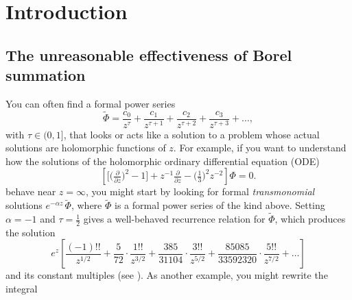 \documentclass{article}
\theoremstyle{definition}
\newcommand{\series}[1]{\tilde{#1}}
\begin{document}
\section{Introduction}
\subsection{The unreasonable effectiveness of Borel summation}\label{intro:summation}
You can often find a formal power series %
\[ \series{\Phi} = \frac{c_0}{z^\tau} + \frac{c_1}{z^{\tau+1}} + \frac{c_2}{z^{\tau+2}} + \frac{c_3}{z^{\tau+3}} + \ldots, \]
with $\tau \in (0, 1]$, that looks or acts like a solution to a problem whose actual solutions are holomorphic functions of $z$. For example, if you want to understand how the solutions of the holomorphic ordinary differential equation (ODE)
\begin{equation}
\left[ \big[ \big(\tfrac{\partial}{\partial z}\big)^2 - 1 \big] + z^{-1} \tfrac{\partial}{\partial z} - \big(\tfrac{1}{3}\big)^2 z^{-2} \right] \Phi= 0. \label{eqn:bessel-rescaled-1}
\end{equation}
behave near $z = \infty$, you might start by looking for formal {\em transmonomial} solutions $e^{-\alpha z}\,\series{\Phi}$, where $\series{\Phi}$ is a formal power series of the kind above. Setting $\alpha = -1$ and $\tau = \tfrac{1}{2}$ gives a well-behaved recurrence relation for $\series{\Phi}$, which produces the solution 
\begin{equation}
e^{z} \left[ \frac{(-1)!!}{z^{1/2}} + \frac{5}{72} \cdot \frac{1!!}{z^{3/2}} + \frac{385}{31104} \cdot \frac{3!!}{z^{5/2}} + \frac{85085}{33592320} \cdot \frac{5!!}{z^{7/2}} + \ldots \right] \label{series:bessel-ex}
\end{equation}
and its constant multiples (see \cite[equation 10.40.1]{dlmf}). As another example, you might rewrite the integral
\end{document}
